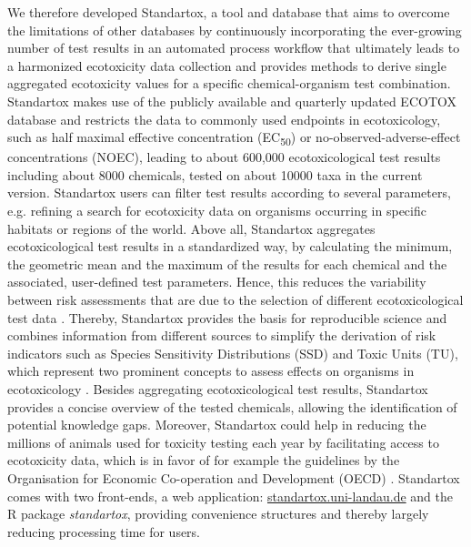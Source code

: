 \documentclass[journal,datadescriptor,submit,moreauthors,pdftex]{Definitions/mdpi}
\begin{document}
We therefore developed Standartox, a tool and database that aims to overcome the limitations of other databases by continuously incorporating the ever-growing number of test results in an automated process workflow that ultimately leads to a harmonized ecotoxicity data collection and provides methods to derive single aggregated ecotoxicity values for a specific chemical-organism test combination. Standartox makes use of the publicly available and quarterly updated ECOTOX database \citep{usepa_ecotox_2019} and restricts the data to commonly used endpoints in ecotoxicology, such as half maximal effective concentration (EC\textsubscript{50}) or no-observed-adverse-effect concentrations (NOEC), leading to about 600,000 ecotoxicological test results including about 8000 chemicals, tested on about 10000 taxa in the current version. Standartox users can filter test results according to several parameters, e.g. refining a search for ecotoxicity data on organisms occurring in specific habitats or regions of the world. Above all, Standartox aggregates ecotoxicological test results in a standardized way, by calculating the minimum, the geometric mean and the maximum of the results for each chemical and the associated, user-defined test parameters. Hence, this reduces the variability between risk assessments that are due to the selection of different ecotoxicological test data \citep{mark_analysis_1998}. Thereby, Standartox provides the basis for reproducible science and combines information from different sources to simplify the derivation of risk indicators such as Species Sensitivity Distributions (SSD) and Toxic Units (TU), which represent two prominent concepts to assess effects on organisms in ecotoxicology \citep{posthuma_species_2002, kefford_definition_2011, schafer_effects_2011}. Besides aggregating ecotoxicological test results, Standartox provides a concise overview of the tested chemicals, allowing the identification of potential knowledge gaps. Moreover, Standartox could help in reducing the millions of animals used for toxicity testing each year by facilitating access to ecotoxicity data, which is in favor of for example the guidelines by the Organisation for Economic Co-operation and Development (OECD) \citep{oecd_oecd_2020, hartung_chemical_2009}. Standartox comes with two front-ends, a web application: \url{standartox.uni-landau.de} and the R \citep{rcoreteam_language_2017} package \textit{standartox}, providing convenience structures and thereby largely reducing processing time for users.

\end{document}
